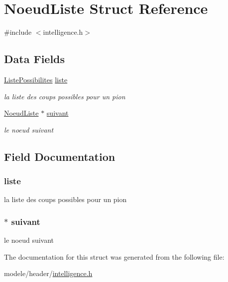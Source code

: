 \hypertarget{struct_noeud_liste}{\section{Noeud\-Liste Struct Reference}
\label{struct_noeud_liste}
}


{\ttfamily \#include $<$intelligence.\-h$>$}

\subsection*{Data Fields}
\begin{DoxyCompactItemize}
\item 
\hyperlink{struct_liste_possibilites}{Liste\-Possibilites} \hyperlink{struct_noeud_liste_a1524f0867a625068835e5d5d8c50f2af}{liste}
\begin{DoxyCompactList}\small\item\em la liste des coups possibles pour un pion \end{DoxyCompactList}\item 
\hyperlink{struct_noeud_liste}{Noeud\-Liste} $\ast$ \hyperlink{struct_noeud_liste_a529a7c3b48b3c2241c37cf4284e79a17}{suivant}
\begin{DoxyCompactList}\small\item\em le noeud suivant \end{DoxyCompactList}\end{DoxyCompactItemize}


\subsection{Field Documentation}
\hypertarget{struct_noeud_liste_a1524f0867a625068835e5d5d8c50f2af}{
\subsubsection[{liste}]{ liste}}\label{struct_noeud_liste_a1524f0867a625068835e5d5d8c50f2af}


la liste des coups possibles pour un pion 

\hypertarget{struct_noeud_liste_a529a7c3b48b3c2241c37cf4284e79a17}{
\subsubsection[{suivant}]{$\ast$ suivant}}\label{struct_noeud_liste_a529a7c3b48b3c2241c37cf4284e79a17}


le noeud suivant 



The documentation for this struct was generated from the following file\-:\begin{DoxyCompactItemize}
\item 
modele/header/\hyperlink{intelligence_8h}{intelligence.\-h}\end{DoxyCompactItemize}
